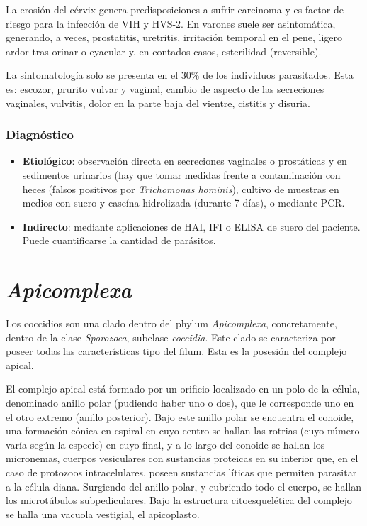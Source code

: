 La erosión del cérvix genera predisposiciones a sufrir carcinoma y es factor de riesgo para la infección de VIH y HVS-2. En varones suele ser asintomática, generando, a veces, prostatitis, uretritis, irritación temporal en el pene, ligero ardor tras orinar o eyacular y, en contados casos, esterilidad (reversible).

La sintomatología solo se presenta en el 30\% de los individuos parasitados. Esta es: escozor, prurito vulvar y vaginal, cambio de aspecto de las secreciones vaginales, vulvitis, dolor en la parte baja del vientre, cistitis y disuria.
\subsubsection{Diagnóstico}
\begin{itemize}[itemsep=0pt,parsep=0pt,topsep=0pt,partopsep=0pt]
	\item \textbf{Etiológico}: observación directa en secreciones vaginales o prostáticas y en sedimentos urinarios (hay que tomar medidas frente a contaminación con heces (falsos positivos por \textit{Trichomonas hominis}), cultivo de muestras en medios con suero y caseína hidrolizada (durante 7 días), o mediante PCR.
	\item \textbf{Indirecto}: mediante aplicaciones de HAI, IFI o ELISA de suero del paciente. Puede cuantificarse la cantidad de parásitos.
\end{itemize}
\newpage
\section{\textit{Apicomplexa}}
Los coccidios son una clado dentro del phylum \textit{Apicomplexa}, concretamente, dentro de la clase \textit{Sporozoea}, subclase \textit{coccidia}. Este clado se caracteriza por poseer todas las características tipo del filum. Esta es la posesión del complejo apical.

El complejo apical está formado por un orificio localizado en un polo de la célula, denominado anillo polar (pudiendo haber  uno o dos), que le corresponde uno en el otro extremo (anillo posterior). Bajo este anillo polar se encuentra el conoide, una formación cónica en espiral en cuyo centro se hallan las rotrias (cuyo número varía según la especie) en cuyo final, y a lo largo del conoide se hallan los micronemas, cuerpos vesiculares con sustancias proteicas en su interior que, en el caso de protozoos intracelulares, poseen sustancias líticas que permiten parasitar a la célula diana. Surgiendo del anillo polar, y cubriendo todo el cuerpo, se hallan los microtúbulos subpediculares. Bajo la estructura citoesquelética del complejo se halla una vacuola vestigial, el apicoplasto.


